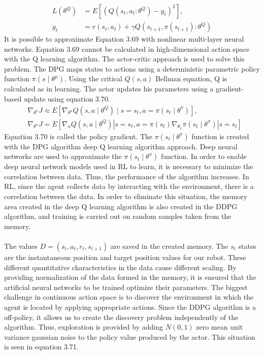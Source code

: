 \documentclass[12pt,twoside,a4]{mwbk}
\begin{document}
\begin{subequations}
\begin{align}
    L\left(\theta^{Q}\right) &=E\left[\left(Q\left(s_{t}, a_{t}: \theta^{Q}\right)-y_{t}\right)^{2}\right], \\
y_{t} &=r\left(s_{t}, a_{t}\right)+\gamma Q\left(s_{t+1}, \pi\left(s_{t+1}\right): \theta^{Q}\right)
\end{align}
\end{subequations}
It is possible to approximate Equation 3.69 with nonlinear multi-layer neural networks. Equation 3.69 cannot be calculated in high-dimensional action space with the Q learning algorithm. The actor-critic approach is used to solve this problem. The DPG maps states to actions using a deterministic parametric policy function $\pi\left(s \mid \theta^{\mu}\right)$. Using the critical $Q(s, a)$ Bellman equation, Q is calculated as in learning. The actor updates his parameters using a gradient-based update using equation 3.70.
\begin{subequations}
\begin{align}
    &\nabla_{\theta^{\pi}} J\approx E\left[\nabla_{\theta^{\pi}} Q\left(s, a \mid \theta^{Q}\right) \mid s=s_{t}, a=\pi\left(s_{t} \mid \theta^{\pi}\right)\right], \\
&\nabla_{\theta^{\pi}} J=E\left[\nabla_{a} Q\left(s, a \mid \theta^{Q}\right)\left|s=s_{t}, a=\pi\left(s_{t}\right) \nabla_{\theta_{\pi}} \pi\left(s_{t} \mid \theta^{\pi}\right)\right| s=s_{t}\right]
\end{align}
\end{subequations}
Equation 3.70 is called the policy gradient. The $\pi\left(s_{t} \mid \theta^{\pi}\right)$ function is created with the DPG algorithm deep $\mathrm{Q}$ learning algorithm approach. Deep neural networks are used to approximate the $\pi\left(s_{t} \mid \theta^{\pi}\right)$ function. In order to enable deep neural network models used in RL to learn, it is necessary to minimize the correlation between data. Thus, the performance of the algorithm increases. In RL, since the agent collects data by interacting with the environment, there is a correlation between the data. In order to eliminate this situation, the memory area created in the deep $\mathrm{Q}$ learning algorithm is also created in the DDPG algorithm, and training is carried out on random samples taken from the memory.
\\ \\
The values $D=\left(s_{t}, a_{t}, r_{t}, s_{t+1}\right)$ are saved in the created memory. The $s_{t}$ states are the instantaneous position and target position values for our robot. These different quantitative characteristics in the data cause different scaling. By providing normalization of the data formed in the memory, it is ensured that the artificial neural networks to be trained optimize their parameters. The biggest challenge in continuous action space is to discover the environment in which the agent is located by applying appropriate actions. Since the DDPG algorithm is a off-policy, it allows us to create the discovery problem independently of the algorithm. Thus, exploration is provided by adding $N(0,1)$ zero mean unit variance gaussian noise to the policy value produced by the actor. This situation is seen in equation 3.71.
\end{document}
